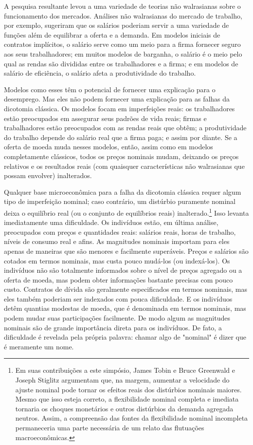\documentclass[12pt]{article}
\begin{document}
A pesquisa resultante levou a uma variedade de teorias não walrasianas sobre o funcionamento dos mercados. Análises não walrasianas do mercado de trabalho, por exemplo, sugeriram que os salários poderiam servir a uma variedade de funções além de equilibrar a oferta e a demanda. Em modelos iniciais de contratos implícitos, o salário serve como um meio para a firma fornecer seguro aos seus trabalhadores; em muitos modelos de barganha, o salário é o meio pelo qual as rendas são divididas entre os trabalhadores e a firma; e em modelos de salário de eficiência, o salário afeta a produtividade do trabalho.

Modelos como esses têm o potencial de fornecer uma explicação para o desemprego. Mas eles não podem fornecer uma explicação para as falhas da dicotomia clássica. Os modelos focam em imperfeições reais: os trabalhadores estão preocupados em assegurar seus padrões de vida reais; firmas e trabalhadores estão preocupados com as rendas reais que obtêm; a produtividade do trabalho depende do salário real que a firma paga; e assim por diante. Se a oferta de moeda muda nesses modelos, então, assim como em modelos completamente clássicos, todos os preços nominais mudam, deixando os preços relativos e os resultados reais (com quaisquer características não walrasianas que possam envolver) inalterados.

Qualquer base microeconômica para a falha da dicotomia clássica requer algum tipo de imperfeição nominal; caso contrário, um distúrbio puramente nominal deixa o equilíbrio real (ou o conjunto de equilíbrios reais) inalterado.\footnote{Em suas contribuições a este simpósio, James Tobin e Bruce Greenwald e Joseph Stiglitz argumentam que, na margem, aumentar a velocidade do ajuste nominal pode tornar os efeitos reais dos distúrbios nominais maiores. Mesmo que isso esteja correto, a flexibilidade nominal completa e imediata tornaria os choques monetários e outros distúrbios da demanda agregada neutros. Assim, a compreensão das fontes da flexibilidade nominal incompleta permaneceria uma parte necessária de um relato das flutuações macroeconômicas.} Isso levanta imediatamente uma dificuldade. Os indivíduos estão, em última análise, preocupados com preços e quantidades reais: salários reais, horas de trabalho, níveis de consumo real e afins. As magnitudes nominais importam para eles apenas de maneiras que são menores e facilmente superáveis. Preços e salários são cotados em termos nominais, mas custa pouco mudá-los (ou indexá-los). Os indivíduos não são totalmente informados sobre o nível de preços agregado ou a oferta de moeda, mas podem obter informações bastante precisas com pouco custo. Contratos de dívida são geralmente especificados em termos nominais, mas eles também poderiam ser indexados com pouca dificuldade. E os indivíduos detêm quantias modestas de moeda, que é denominada em termos nominais, mas podem mudar suas participações facilmente. De modo algum as magnitudes nominais são de grande importância direta para os indivíduos. De fato, a dificuldade é revelada pela própria palavra: chamar algo de "nominal" é dizer que é meramente um nome.
\end{document}
